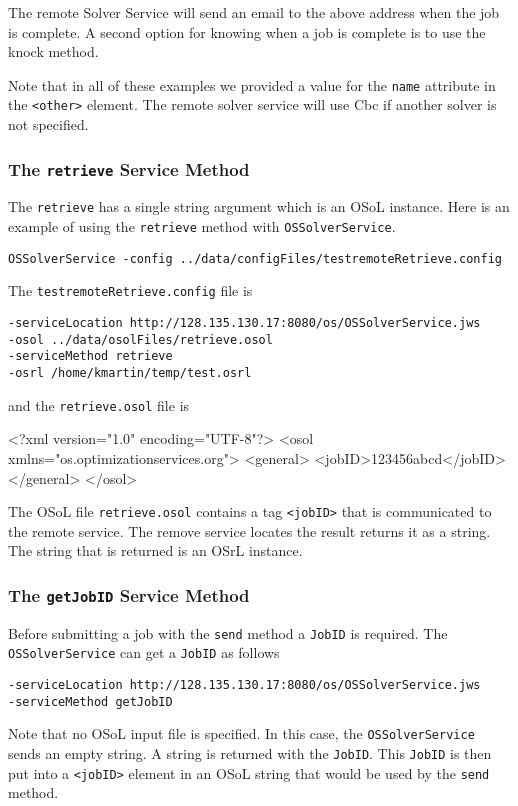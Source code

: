 \documentclass[11pt]{article}
\renewcommand{\_}{{\char"5F}}
\renewcommand{\{}{{\char"7B}}
\renewcommand{\}}{{\char"7D}}
\renewcommand{\^}{{\char"0D}}
\renewcommand{\'}{{\char"0D}}
\begin{document}
The remote Solver Service will send an email to the above address when the job is complete. A second option for knowing when a job is complete is to use the knock method. 

Note that in all of these examples we provided a value for the {\tt name} attribute in the {\tt <other>} element. The remote solver service will use Cbc if another solver is not specified. 



\subsubsection{The  {\tt retrieve} Service Method}\label{section:retrieve}

The {\tt retrieve} has a single string argument which is an OSoL instance. Here is an example of using the {\tt retrieve} method with {\tt OSSolverService}.
\begin{verbatim}
OSSolverService -config ../data/configFiles/testremoteRetrieve.config
\end{verbatim}
The {\tt testremoteRetrieve.config} file is
\begin{verbatim}
-serviceLocation http://128.135.130.17:8080/os/OSSolverService.jws
-osol ../data/osolFiles/retrieve.osol
-serviceMethod retrieve
-osrl /home/kmartin/temp/test.osrl
\end{verbatim}
and the {\tt retrieve.osol} file is
\begin{verbatimtab}[4]
<?xml version="1.0" encoding="UTF-8"?>
<osol xmlns="os.optimizationservices.org">
 	<general>         
 		<jobID>123456abcd</jobID>  
	</general>
</osol>
\end{verbatimtab}
The OSoL file {\tt retrieve.osol} contains a tag {\tt <jobID>} that is communicated to the remote service. The remove service locates the result returns it as a string. The string that is returned is an OSrL instance. 

\subsubsection{The  {\tt getJobID} Service Method}\label{section:getjobid}

Before  submitting a job with the {\tt send} method a {\tt JobID} is required. The {\tt OSSolverService} can get a {\tt JobID} as follows
\begin{verbatim}
-serviceLocation http://128.135.130.17:8080/os/OSSolverService.jws
-serviceMethod getJobID
\end{verbatim}
Note that no OSoL input file is specified. In this case, the {\tt OSSolverService} sends an empty string. A string is returned with the {\tt JobID}. This {\tt JobID} is then put into a {\tt <jobID>} element in an OSoL string that would be used by the {\tt send} method.
\end{document}
